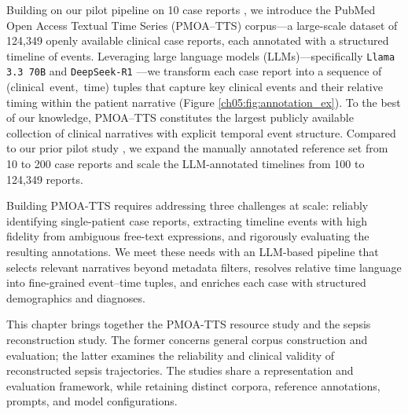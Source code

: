 Building on our pilot pipeline on 10 case reports \citep{wang2025large}, we introduce the PubMed Open Access Textual Time Series (PMOA–TTS) corpus—a large-scale dataset of 124{,}349 openly available clinical case reports, each annotated with a structured timeline of events.
Leveraging large language models (LLMs)—specifically \texttt{Llama 3.3 70B} \citep{grattafiori2024llama} and \texttt{DeepSeek-R1} \citep{guo2025deepseek}—we transform each case report into a sequence of \mbox{(clinical event, time)} tuples that capture key clinical events and their relative timing within the patient narrative (Figure \ref{ch05:fig:annotation_ex}).
To the best of our knowledge, PMOA–TTS constitutes the largest publicly available collection of clinical narratives with explicit temporal event structure.
Compared to our prior pilot study \cite{wang2025large}, we expand the manually annotated reference set from 10 to 200 case reports and scale the LLM-annotated timelines from 100 to 124{,}349 reports. 

Building PMOA-TTS requires addressing three challenges at scale: reliably identifying single-patient case reports, extracting timeline events with high fidelity from ambiguous free-text expressions, and rigorously evaluating the resulting annotations.
We meet these needs with an LLM-based pipeline that selects relevant narratives beyond metadata filters, resolves relative time language into fine-grained event--time tuples, and enriches each case with structured demographics and diagnoses. 

This chapter brings together the PMOA-TTS resource study and the sepsis reconstruction study.
The former concerns general corpus construction and evaluation; the latter examines the reliability and clinical validity of reconstructed sepsis trajectories.
The studies share a representation and evaluation framework, while retaining distinct corpora, reference annotations, prompts, and model configurations.
